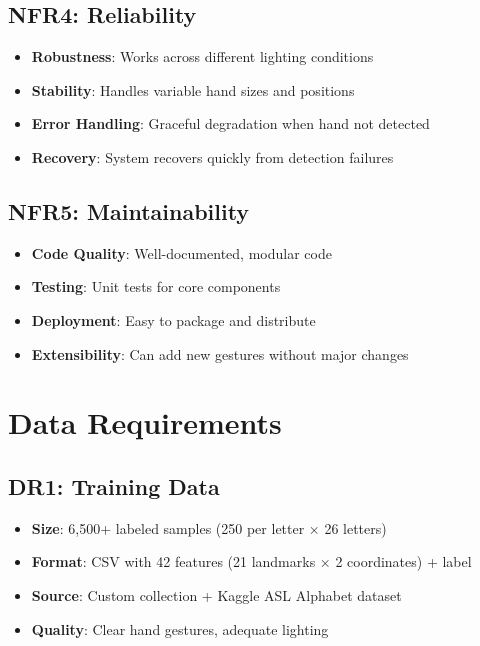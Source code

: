 \subsection{NFR4: Reliability}
\begin{itemize}
    \item \textbf{Robustness}: Works across different lighting conditions
    \item \textbf{Stability}: Handles variable hand sizes and positions
    \item \textbf{Error Handling}: Graceful degradation when hand not detected
    \item \textbf{Recovery}: System recovers quickly from detection failures
\end{itemize}

\subsection{NFR5: Maintainability}
\begin{itemize}
    \item \textbf{Code Quality}: Well-documented, modular code
    \item \textbf{Testing}: Unit tests for core components
    \item \textbf{Deployment}: Easy to package and distribute
    \item \textbf{Extensibility}: Can add new gestures without major changes
\end{itemize}

\vspace{1em}
\section{Data Requirements}

\subsection{DR1: Training Data}
\begin{itemize}
    \item \textbf{Size}: 6,500+ labeled samples (250 per letter × 26 letters)
    \item \textbf{Format}: CSV with 42 features (21 landmarks × 2 coordinates) + label
    \item \textbf{Source}: Custom collection + Kaggle ASL Alphabet dataset
    \item \textbf{Quality}: Clear hand gestures, adequate lighting
\end{itemize}

